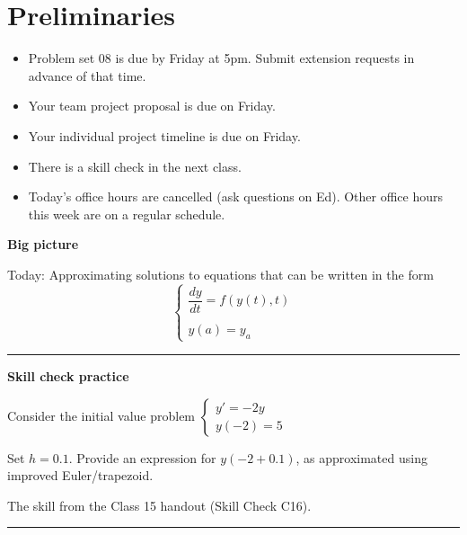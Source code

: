 \documentclass[12pt,letterpaper,noanswers]{exam}
\begin{document}
 \pdfpageheight 11in 
  \pdfpagewidth 8.5in

\noindent 

\section*{Preliminaries}

\begin{itemize}
\itemsep0pt
\item Problem set 08 is due by Friday at 5pm.  Submit extension requests in advance of that time.
\item Your team project proposal is due on Friday.
\item Your individual project timeline is due on Friday.
\item There is a skill check in the next class.
\item Today's office hours are cancelled (ask questions on Ed).  Other office hours this week are on a regular schedule.
\end{itemize}


\noindent\textbf{Big picture}

Today: Approximating solutions to equations that can be written in the form \[\displaystyle\left\{\begin{array}{l}\dfrac{dy}{dt} = f(y(t),t) \\
\\
y(a) = y_a\end{array}\right.\]

\vspace{0.2cm}
\hrule
\vspace{0.2cm}

\noindent \textbf{Skill check practice}
\begin{questions}
\item Consider the initial value problem $\left\{\begin{array}{l}
y' = -2y \\
y(-2) = 5
\end{array}
\right.$

Set $h = 0.1$.  Provide an expression for $y(-2+0.1)$, as approximated using improved Euler/trapezoid.

\item The skill from the Class 15 handout (Skill Check C16).
\end{questions}


\vspace{0.2cm}
\hrule
\vspace{0.2cm}
\end{document}
